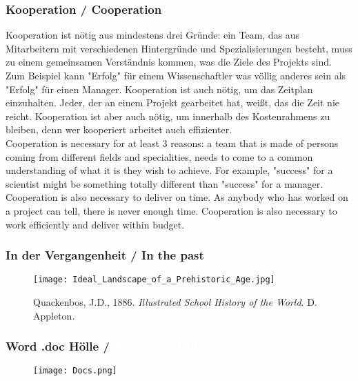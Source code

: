 \documentclass[12pt]{beamer}
\begin{document}
{\scriptsize
\begin{frame}
  \frametitle{Kooperation / \textcolor{mfn_green}{Cooperation}}
  Kooperation ist nötig aus mindestens drei Gründe: ein Team, das aus Mitarbeitern mit verschiedenen Hintergründe und Spezialisierungen besteht, muss zu einem gemeinsamen Verständnis kommen, was die Ziele des Projekts sind. Zum Beispiel kann "Erfolg" für einem Wissenschaftler was völlig anderes sein als "Erfolg" für einen Manager. Kooperation ist auch nötig, um das Zeitplan einzuhalten. Jeder, der an einem Projekt gearbeitet hat, weißt, das die Zeit nie reicht. Kooperation ist aber auch nötig, um innerhalb des Kostenrahmens zu bleiben, denn wer kooperiert arbeitet auch effizienter.\\
  \bigskip
  \textcolor{mfn_green}{Cooperation is necessary for at least 3 reasons: a team that is made of persons coming from different fields and specialities, needs to come to a common understanding of what it is they wish to achieve. For example, "success" for a scientist might be something totally different than "success" for a manager. Cooperation is also necessary to deliver on time. As anybody who has worked on a project can tell, there is never enough time. Cooperation is also necessary to work efficiently and deliver within budget.}
\end{frame}
}
%
%

\begin{frame}
  \frametitle{In der Vergangenheit / \textcolor{mfn_green}{In the past}}
  \begin{figure}
    \texttt{[image: Ideal\_Landscape\_of\_a\_Prehistoric\_Age.jpg]}
    \caption{Quackenbos, J.D., 1886. \textit{Illustrated School History of the World}. D. Appleton.}
  \end{figure}
\end{frame}

{
\begin{frame}
  \frametitle{Word\textsuperscript{\tiny\textregistered} .doc Hölle /
    \textcolor{white}{Word\textsuperscript{\tiny\textregistered} .doc hell}}
  \begin{figure}
  \texttt{[image: Docs.png]}
  \end{figure}
\end{frame}
}
\end{document}
